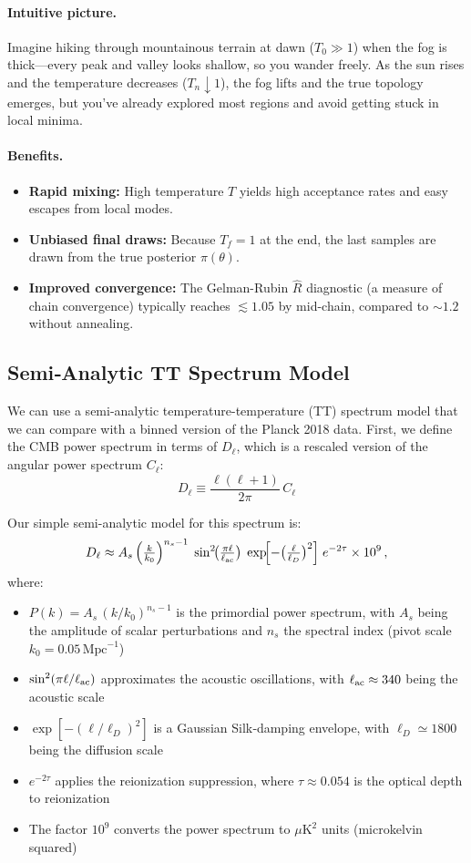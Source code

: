 \documentclass[11pt]{article}
\theoremstyle{definition}
\begin{document}
\paragraph{Intuitive picture.}  
Imagine hiking through mountainous terrain at dawn (\(T_0\gg1\)) when the fog is thick—every peak and valley looks shallow, so you wander freely. As the sun rises and the temperature decreases (\(T_n\downarrow1\)), the fog lifts and the true topology emerges, but you've already explored most regions and avoid getting stuck in local minima.

\paragraph{Benefits.}  
\begin{itemize}
  \item \textbf{Rapid mixing:} High temperature \(T\) yields high acceptance rates and easy escapes from local modes.
  \item \textbf{Unbiased final draws:} Because \(T_f=1\) at the end, the last samples are drawn from the true posterior \(\pi(\theta)\).
  \item \textbf{Improved convergence:} The Gelman-Rubin \(\widehat{R}\) diagnostic (a measure of chain convergence) typically reaches \(\lesssim1.05\) by mid-chain, compared to \(\sim1.2\) without annealing.
\end{itemize}


\subsection{Semi‑Analytic TT Spectrum Model}

We can use a semi-analytic temperature-temperature (TT) spectrum model that we can compare with a binned version of the Planck 2018 data. First, we define the CMB power spectrum in terms of $D_{\ell}$, which is a rescaled version of the angular power spectrum $C_{\ell}$:
\[
D_\ell \equiv \frac{\ell(\ell+1)}{2\pi}\,C_\ell
\]

Our simple semi-analytic model for this spectrum is:
\[
D_\ell \approx A_s \,\Bigl(\tfrac{k}{k_0}\Bigr)^{n_s-1}
\;\sin^2\!\bigl(\tfrac{\pi\ell}{\ell_{\rm ac}}\bigr)
\;\exp\!\Bigl[-\bigl(\tfrac{\ell}{\ell_D}\bigr)^2\Bigr]
\;e^{-2\tau}\times10^{9}\,,
\]
where:
\begin{itemize}
  \item $P(k)=A_s\,(k/k_0)^{n_s-1}$ is the primordial power spectrum, with $A_s$ being the amplitude of scalar perturbations and $n_s$ the spectral index (pivot scale $k_0=0.05\,\mathrm{Mpc}^{-1}$)
  \item $\sin^2(\pi\ell/\ell_{\rm ac})$ approximates the acoustic oscillations, with $\ell_{\rm ac}\approx340$ being the acoustic scale
  \item $\exp[-(\ell/\ell_D)^2]$ is a Gaussian Silk‑damping envelope, with $\ell_D\simeq1800$ being the diffusion scale
  \item $e^{-2\tau}$ applies the reionization suppression, where $\tau\approx0.054$ is the optical depth to reionization
  \item The factor $10^9$ converts the power spectrum to $\mu\mathrm{K}^2$ units (microkelvin squared)
\end{itemize}
\end{document}
